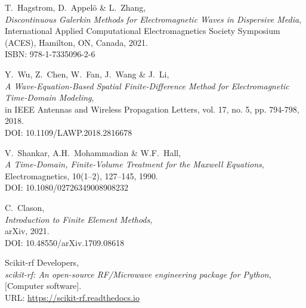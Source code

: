 \documentclass[11pt,a4paper,twoside,pdf]{article}
\numberwithin{equation}{section}
\begin{document}
\begin{thebibliography}{100}
  T.~Hagstrom, D.~Appelö  \& L.~Zhang, \\
  {\em Discontinuous Galerkin Methods for Electromagnetic Waves in Dispersive Media}, \\
  International Applied Computational Electromagnetics Society Symposium (ACES), Hamilton, ON, Canada, 2021.\\
  ISBN: 978-1-7335096-2-6

  Y.~Wu, Z.~Chen, W.~Fan, J.~Wang \& J.~Li, \\
  {\em A Wave-Equation-Based Spatial Finite-Difference Method for Electromagnetic Time-Domain Modeling}, \\
  in IEEE Antennas and Wireless Propagation Letters, vol. 17, no. 5, pp. 794-798, 2018.\\
  DOI: 10.1109/LAWP.2018.2816678

  V.~Shankar, A.H.~Mohammadian \& W.F.~Hall, \\
  {\em A Time-Domain, Finite-Volume Treatment for the Maxwell Equations}, \\
  Electromagnetics, 10(1–2), 127–145, 1990.\\
  DOI: 10.1080/02726349008908232

  C.~Clason, \\
  {\em Introduction to Finite Element Methods}, \\
  arXiv, 2021.\\
  DOI: 10.48550/arXiv.1709.08618

  Scikit-rf Developers, \\
  {\em scikit-rf: An open-source RF/Microwave engineering package for Python},\\  
$[$Computer software$]$.\\
 URL: \href{https://scikit-rf.readthedocs.io}{https://scikit-rf.readthedocs.io}


\end{thebibliography}
\end{document}
